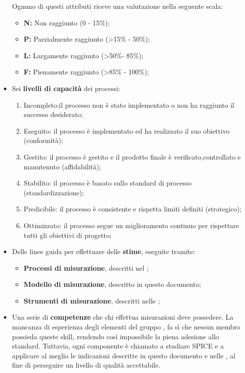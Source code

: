 \begin{itemize}
	Ognuno di questi attributi riceve una valutazione nella seguente scala:
	\begin{itemize}
	    \item \textbf{N: }Non raggiunto (0 - 15\%);
	    \item \textbf{P: }Parzialmente raggiunto (>15\% - 50\%);
	    \item \textbf{L: }Largamente raggiunto (>50\%- 85\%);
	    \item \textbf{F: }Pienamente raggiunto (>85\% - 100\%);
	\end{itemize}
	\item Sei \textbf{livelli di capacità} dei processi:
		\begin{enumerate}[start=0]
			\item Incompleto:il processo non è stato implementato o non ha raggiunto il successo desiderato;
			\item Eseguito: il processo è implementato ed ha realizzato il suo obiettivo (conformità);
			\item Gestito: il processo è gestito e il prodotto finale è verificato,controllato e manutenuto (affidabilità);
			\item Stabilito: il processo è basato sullo standard di processo (standardizzazione);
			\item Predicibile: il processo è consistente e rispetta limiti definiti (strategico);
			\item Ottimizzato: il processo segue un  miglioramento continuo per rispettare tutti gli obiettivi di progetto;
		\end{enumerate}
	\item Delle linee guida per effettuare delle \textbf{stime}, eseguite tramite:
		\begin{itemize}
			\item \textbf{Processi di misurazione}, descritti nel \PdP ;
			\item \textbf{Modello di misurazione}, descritto in questo documento;
			\item \textbf{Strumenti di misurazione}, descritti nelle \NdP ;
		\end{itemize}
	\item Una serie di \textbf{competenze} che chi effettua misurazioni deve possedere. La mancanza di esperienza degli elementi del gruppo \gruppo , fa sì che nessun membro possieda queste skill, rendendo così impossibile la piena adesione allo standard. Tuttavia, ogni componente è chiamato a studiare SPICE e a applicare al meglio le indicazioni descritte in questo documento e nelle \NdP , al fine di perseguire un livello di qualità accettabile.
	
\end{itemize}
